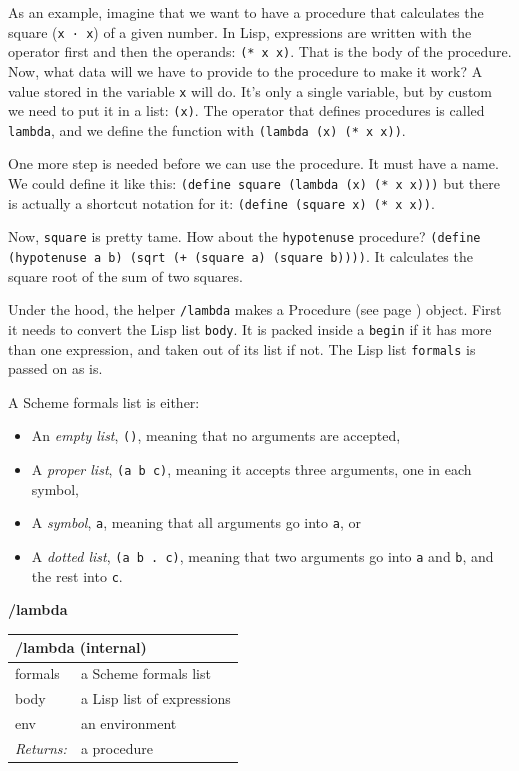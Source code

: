 \documentclass[twoside,9pt]{report}
\begin{document}
As an example, imagine that we want to have a procedure that calculates the square (\texttt{x · x}) of a given number. In Lisp, expressions are written with the operator first and then the operands: \texttt{(* x x)}. That is the body of the procedure. Now, what data will we have to provide to the procedure to make it work? A value stored in the variable \texttt{x} will do. It's only a single variable, but by custom we need to put it in a list: \texttt{(x)}. The operator that defines procedures is called \texttt{lambda}, and we define the function with \texttt{(lambda (x) (* x x))}.


One more step is needed before we can use the procedure. It must have a name. We could define it like this: \texttt{(define square (lambda (x) (* x x)))} but there is actually a shortcut notation for it: \texttt{(define (square x) (* x x))}.


Now, \texttt{square} is pretty tame. How about the \texttt{hypotenuse} procedure? \texttt{(define (hypotenuse a b) (sqrt (+ (square a) (square b))))}. It calculates the square root of the sum of two squares.


Under the hood, the helper \texttt{/lambda} makes a Procedure (see page \pageref{control}) object. First it needs to convert the Lisp list \texttt{body}. It is packed inside a \texttt{begin} if it has more than one expression, and taken out of its list if not. The Lisp list \texttt{formals} is passed on as is.


A Scheme formals list is either:

\begin{itemize}
\item An \emph{empty list}, \texttt{()}, meaning that no arguments are accepted,
\item A \emph{proper list}, \texttt{(a b c)}, meaning it accepts three arguments, one in each symbol,
\item A \emph{symbol}, \texttt{a}, meaning that all arguments go into \texttt{a}, or
\item A \emph{dotted list}, \texttt{(a b . c)}, meaning that two arguments go into \texttt{a} and \texttt{b}, and the rest into \texttt{c}.
\end{itemize}

\textbf{/lambda}

\begin{tabular}{ |l l| }
\hline
\multicolumn{2}{|l|}{/lambda (internal)} \\
\hline
formals & a Scheme formals list \\
body & a Lisp list of expressions \\
env & an environment \\
\textit{Returns:} & a procedure \\
\hline
\end{tabular}
\end{document}
